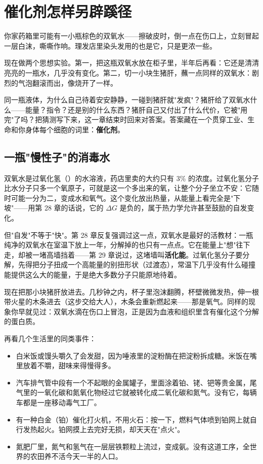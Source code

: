 \chapter{催化剂怎样另辟蹊径}

\begin{kaichang}
你家药箱里可能有一小瓶棕色的双氧水——擦破皮时，倒一点在伤口上，立刻冒起一层白沫，嘶嘶作响。理发店里染头发用的也是它，只是更浓一些。

现在做两个思想实验。第一，把这瓶双氧水放在柜子里，半年后再看：它还是清清亮亮的一瓶水，几乎没有变化。第二，切一小块生猪肝，蘸一点同样的双氧水：剧烈的气泡翻滚而出，像烧开了一样。

同一瓶液体，为什么自己待着安安静静，一碰到猪肝就"发疯"？猪肝给了双氧水什么——能量？指令？还是别的什么东西？猪肝自己又付出了什么代价，它被"用完"了吗？把猜测写下来，这一章结束时回来对答案。答案藏在一个贯穿工业、生命和你身体每个细胞的词里：\textbf{催化剂}。
\end{kaichang}

\section{一瓶"慢性子"的消毒水}

双氧水是过氧化氢（）的水溶液，药店里卖的大约只有 3\% 的浓度。过氧化氢分子比水分子只多一个氧原子，可就是这一个多出来的氧，让整个分子坐立不安：它随时可能一分为二，变成水和氧气。这个变化放出热量，从能量上看完全是"下坡"——用第 28 章的话说，它的 $\Delta G$ 是负的，属于热力学允许甚至鼓励的自发变化。

但"自发"不等于"快"。第 28 章反复强调过这一点，双氧水是最好的活教材：一瓶纯净的双氧水在室温下放上一年，分解掉的也只有一点点。它在能量上"想"往下走，却被一堵高墙挡着——第 29 章说过，这堵墙叫\textbf{活化能}。过氧化氢分子要分解，先得把分子扭成一个高能量的别扭形状（过渡态），常温下几乎没有什么碰撞能提供这么大的能量，于是绝大多数分子只能原地待着。

现在把那小块猪肝放进去。几秒钟之内，杯子里泡沫翻腾，杯壁微微发热，伸一根带火星的木条进去（这步交给大人），木条会重新燃起来——那是氧气。同样的现象你早就见过：双氧水滴在伤口上冒泡，正是因为血液和组织里含有催化这个分解的蛋白质。

再看几个生活里的同类事件：

\begin{itemize}[itemsep=2pt]
\item 白米饭或馒头嚼久了会发甜，因为唾液里的淀粉酶在把淀粉拆成糖。米饭在嘴里放着不嚼，甜味来得慢得多。
\item 汽车排气管中段有一个不起眼的金属罐子，里面涂着铂、铑、钯等贵金属，尾气里的一氧化碳和氮氧化物经过它就被转化成二氧化碳和氮气。没有它，每辆车都是一座移动毒气工厂。
\item 有一种白金（铂）催化打火机，不用火石：按一下，燃料气体喷到铂网上就自行发热起火。铂网摸上去完好无损，却天天在"点火"。
\item 氮肥厂里，氮气和氢气在一层层铁颗粒上流过，变成氨。没有这道工序，全世界的农田养不活今天一半的人口。
\end{itemize}

